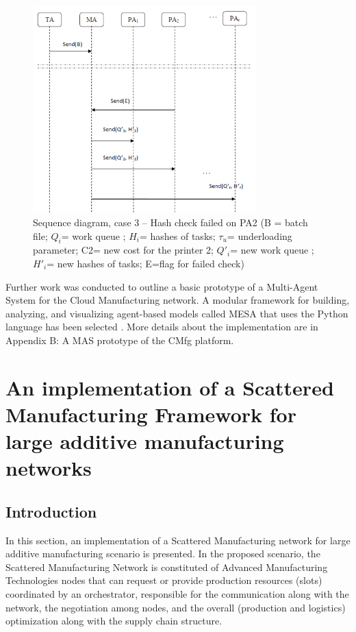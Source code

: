 \begin{figure}[h]
    \centering
    \includegraphics[height=8cm, keepaspectratio]{images/sequence-diagram-case3}
    \caption{Sequence diagram, case 3 – Hash check failed on PA2 (B = batch file; $Q_i$= work queue ; $H_i$= hashes of tasks; $\tau_u$= underloading parameter; C2= new cost for the printer 2; $Q\prime_i$= new work queue ; $H\prime_i$= new hashes of tasks; E=flag for failed check)}
    \label{fig:seq-diag-case3}
\end{figure}

Further work was conducted to outline a basic prototype of a Multi-Agent System for the Cloud Manufacturing network. A modular framework for building, analyzing, and visualizing agent-based models called MESA that uses the Python language has been selected \parencite{masad2015mesa}. More details about the implementation are in Appendix B: A MAS prototype of the CMfg platform.

\section{An implementation of a Scattered Manufacturing Framework for large additive manufacturing networks}
\subsection{Introduction}
In this section, an implementation of a Scattered Manufacturing network for large additive manufacturing scenario is presented. In the proposed scenario, the Scattered Manufacturing Network is constituted of Advanced Manufacturing Technologies nodes that can request or provide production resources (slots) coordinated by an orchestrator, responsible for the communication along with the network, the negotiation among nodes, and the overall (production and logistics) optimization along with the supply chain structure.\\

